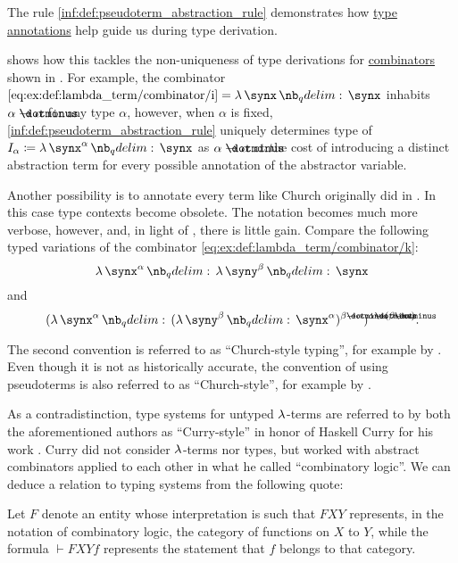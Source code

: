 \begin{remark}\label{rem:explicit_and_implicit_typing}
  The rule \ref{inf:def:pseudoterm_abstraction_rule} demonstrates how \hyperref[con:type_annotation]{type annotations} help guide us during type derivation.

   shows how this tackles the non-uniqueness of type derivations for \hyperref[def:lambda_combinator]{combinators} shown in . For example, the combinator \( \ref{eq:ex:def:lambda_term/combinator/i} = \qabs \synx \synx \) inhabits \( \alpha \synimplies \alpha \) for any type \( \alpha \), however, when \( \alpha \) is fixed, \ref{inf:def:pseudoterm_abstraction_rule} uniquely determines  type of \( I_\alpha \coloneqq \qabs {\synx^\alpha} \synx \) as \( \alpha \synimplies \alpha \) at the cost of introducing a distinct abstraction term for every possible annotation of the abstractor variable.

  Another possibility is to annotate every term like Church originally did in \cite{Church1940STT}. In this case type contexts become obsolete. The notation becomes much more verbose, however, and, in light of , there is little gain. Compare the following typed variations of the combinator \ref{eq:ex:def:lambda_term/combinator/k}:
  \begin{equation*}
    \qabs {\synx^\alpha} \qabs {\syny^\beta} \synx
  \end{equation*}
  and
  \begin{equation*}
    (\qabs {\synx^\alpha} (\qabs {\syny^\beta} \synx^\alpha)^{\beta \synimplies \alpha})^{\alpha \synimplies (\beta \synimplies \alpha)}.
  \end{equation*}

  The second convention is referred to as \enquote{Church-style typing}, for example by \cite[ch. 5]{Hindley1997STT}. Even though it is not as historically accurate, the convention of using pseudoterms is also referred to as \enquote{Church-style}, for example by .

  As a contradistinction, type systems for untyped \( \mathrm{\lambda} \)-terms are referred to by both the aforementioned authors as \enquote{Curry-style} in honor of Haskell Curry for his work \cite{Curry1934CombinatoryLogic}. Curry did not consider \( \mathrm{\lambda} \)-terms nor types, but worked with abstract combinators applied to each other in what he called \enquote{combinatory logic}. We can deduce a relation to typing systems from the following quote:
  \begin{displayquote}
    Let \( F \) denote an entity whose interpretation is such that \( FXY \) represents, in the notation of combinatory logic, the category of functions on \( X \) to \( Y \), while the formula \( \vdash FXYf \) represents the statement that \( f \) belongs to that category.
  \end{displayquote}


\end{remark}
